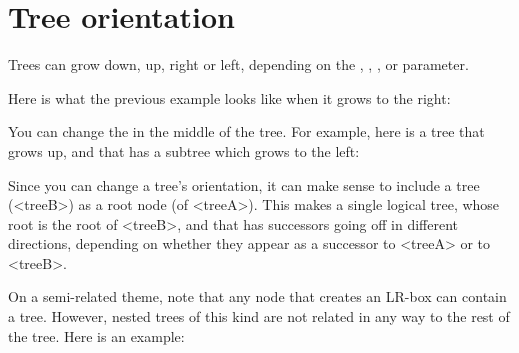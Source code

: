 \documentclass[11pt,english,BCOR10mm,DIV12,bibliography=totoc,parskip=false,smallheadings
    headexclude,footexclude,oneside]{pst-doc}
\begin{document}
\section{Tree orientation}

Trees can grow down, up, right or left, depending on the 
, , , or  parameter.

Here is what the previous example looks like when it grows to the right:

\begin{LTXexample}[pos=l,width=0.4\linewidth]
\end{LTXexample}


You can change the  in the middle of the tree.
For example, here is a tree that grows up, and that has a subtree which grows
to the left:

\begin{LTXexample}[pos=l,width=0.4\linewidth]
  \footnotesize
\end{LTXexample}

Since you can change a tree's orientation, it can make sense to include a tree
(<treeB>) as a root node (of <treeA>). This makes a single logical tree, whose
root is the root of <treeB>, and that has successors going off in different
directions, depending on whether they appear as a successor to <treeA> or to
<treeB>.

\begin{LTXexample}[pos=l,width=0.4\linewidth]
\end{LTXexample}


On a semi-related theme, note that any node that creates an LR-box can contain
a tree. However, nested trees of this kind are not related in any way to the
rest of the tree. Here is an example:

\begin{LTXexample}[pos=l,width=0.4\linewidth]
    \TC
    \TC
  \endpsTree
\end{LTXexample}
\end{document}
